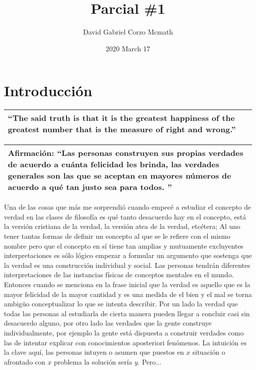 \documentclass{article}
\title{Parcial \#1}
\date{2020 March 17}
\author{David Gabriel Corzo Mcmath}
\begin{document}
\maketitle
\section{Introducción}
\begin{center}
    \begin{tabular}{ |p{14cm}| }
        \hline
            ``The said truth is that it is the greatest happiness of the greatest number that is the measure of right and wrong.'' \\
        \hline
    \end{tabular}
\end{center}
\begin{center}
    \begin{tabular}{ |p{14cm}| }
        \hline
        Afirmación: ``Las personas construyen sus propias verdades de acuerdo a cuánta felicidad les brinda, las verdades generales son las que se aceptan en mayores números de acuerdo a qué tan justo sea para todos. '' \\ 
        \hline
    \end{tabular}
\end{center}
Una de las cosas que más me sorprendió cuando empecé a estudiar el concepto de verdad en las clases de filosofía es qué tanto desacuerdo hay en el concepto, está la versión cristiana de la verdad, la versión atea de la verdad, etcétera; Al uno tener tantas formas de definir un concepto al que se le refiere con el mismo nombre pero que el concepto en sí tiene tan amplias y mutuamente excluyentes interpretaciones es sólo lógico empezar a formular un argumento que sostenga que la verdad es una construcción individual y social. Las personas tendrán diferentes interpretaciones de las instancias físicas de conceptos mentales en el mundo. Entonces cuando se menciona en la frase inicial que la verdad es aquello que es la mayor felicidad de la mayor cantidad y es una medida de el bien y el mal se torna ambigüo conceptualizar lo que se intenta describir. Por un lado la verdad que todas las personas al estudiarla de cierta manera pueden llegar a concluir casi sin desacuerdo alguno, por otro lado las verdades que la gente construye individualmente, por ejemplo la gente está dispuesta a construir verdades como las de intentar explicar con conocimientos aposteriori fenómenos. La intuición es la clave aquí, las personas intuyen o asumen que puestos en $x$ situación o afrontado con $x$ problema la solución sería $y$. Pero...    
\end{document}

